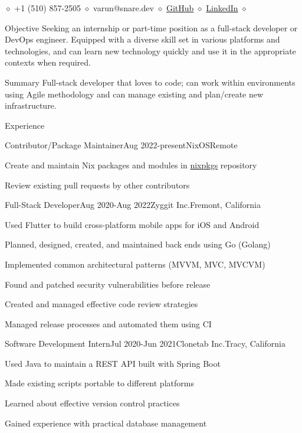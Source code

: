 \documentclass{resume}
\def \sep {$\diamond$ }
\begin{document}
\centerline{
  \sep +1 (510) 857-2505
  \sep varun@snare.dev
  \sep {\href{https://github.com/water-sucks}{GitHub}}
  \sep {\href{https://www.linkedin.com/in/varun-narravula-a68725249}{LinkedIn}}
  \sep
}

\begin{rSection}{Objective}
  Seeking an internship or part-time position as a full-stack developer or DevOps engineer. Equipped with
  a diverse skill set in various platforms and technologies, and can learn new technology quickly and use it
  in the appropriate contexts when required.
\end{rSection}

\begin{rSection}{Summary}
  Full-stack developer that loves to code; can work within environments using Agile methodology and can
  manage existing and plan/create new infrastructure.
\end{rSection}

\begin{rSection}{Experience}
  \begin{rSubsection}{Contributor/Package Maintainer}{Aug 2022-present}{NixOS}{Remote}
    \item{Create and maintain Nix packages and modules in \href{https://github.com/NixOS/nixpkgs}{nixpkgs} repository}
    \item{Review existing pull requests by other contributors}
  \end{rSubsection}
  \begin{rSubsection}{Full-Stack Developer}{Aug 2020-Aug 2022}{Zyggit Inc.}{Fremont, California}
    \item{Used Flutter to build cross-platform mobile apps for iOS and Android}
    \item{Planned, designed, created, and maintained back ends using Go (Golang)}
    \item{Implemented common architectural patterns (MVVM, MVC, MVCVM)}
    \item{Found and patched security vulnerabilities before release}
    \item{Created and managed effective code review strategies}
    \item{Managed release processes and automated them using CI}
  \end{rSubsection}
  \begin{rSubsection}{Software Development Intern}{Jul 2020-Jun 2021}{Clonetab Inc.}{Tracy, California}
    \item{Used Java to maintain a REST API built with Spring Boot}
    \item{Made existing scripts portable to different platforms}
    \item{Learned about effective version control practices}
    \item{Gained experience with practical database management}
  \end{rSubsection}
\end{rSection}
\end{document}
